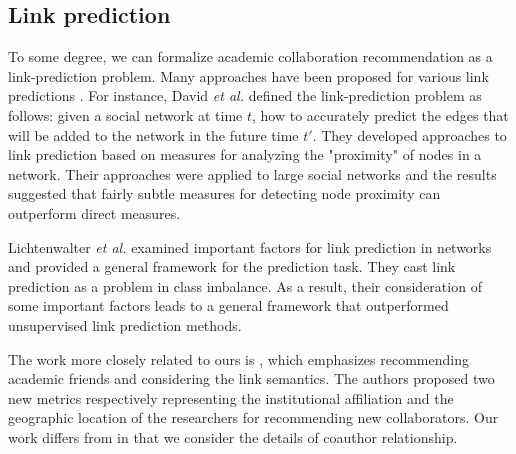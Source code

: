 \documentclass[10pt,journal,compsoc]{IEEEtran}
\begin{document}
\subsection{Link prediction}
To some degree, we can formalize academic collaboration recommendation as a link-prediction problem. Many approaches have been proposed for various link predictions \cite{Liu:linkprediction}. For instance, David \textit{et al.} \cite{LN:linkprediction} defined the link-prediction problem as follows: given a social network at time $t$, how to accurately predict the edges that will be added to the network in the future time $t'$. They developed approaches to link prediction based on measures for analyzing the "proximity" of nodes in a network. Their approaches were applied to large social networks and the results suggested that fairly subtle measures for detecting node proximity can outperform direct measures.

Lichtenwalter \textit{et al.} \cite{Lichtenwalter:new} examined important factors for link prediction in networks and provided a general framework for the prediction task. They cast link prediction as a problem in class imbalance. As a result, their  consideration of some important factors leads to a general framework that outperformed unsupervised link prediction methods.

The work more closely related to ours is \cite{Brandao:using}, which emphasizes recommending academic friends and considering the link semantics. The authors proposed two new metrics respectively representing the institutional affiliation and the geographic location of the researchers for recommending new collaborators. Our work differs from \cite{Brandao:using} in that we consider the details of coauthor relationship.
\end{document}
